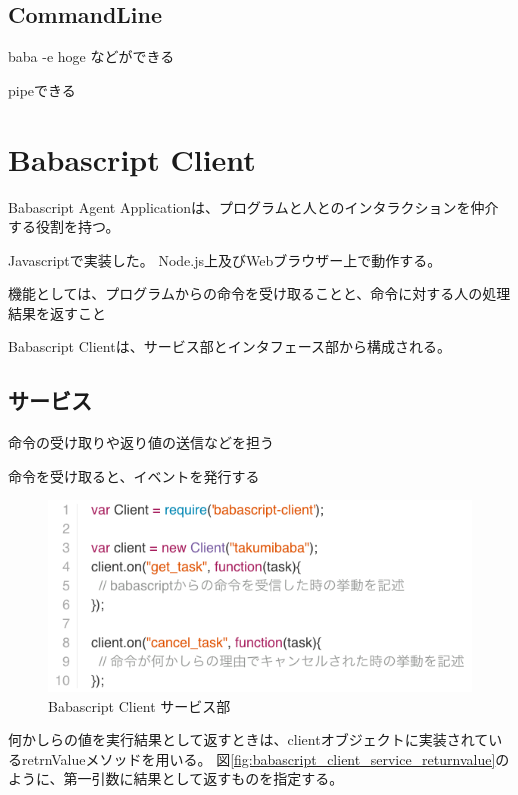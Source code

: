 \subsection{CommandLine}\label{commandline}

baba -e hoge などができる

pipeできる

\section{Babascript Client}\label{babascript-client}

Babascript Agent
Applicationは、プログラムと人とのインタラクションを仲介する役割を持つ。

Javascriptで実装した。 Node.js上及びWebブラウザー上で動作する。

機能としては、プログラムからの命令を受け取ることと、命令に対する人の処理結果を返すこと

Babascript Clientは、サービス部とインタフェース部から構成される。

\subsection{サービス}\label{ux30b5ux30fcux30d3ux30b9}

命令の受け取りや返り値の送信などを担う

命令を受け取ると、イベントを発行する

\begin{figure}[htbp]
  \begin{center}
  \includegraphics[width=.8\linewidth,bb=0 0 560 253]{images/babascript_client_service.js.png}
  \end{center}
  \caption{Babascript Client サービス部}
  \label{fig:babascript_client_service}
\end{figure}

何かしらの値を実行結果として返すときは、clientオブジェクトに実装されているretrnValueメソッドを用いる。
図\ref{fig:babascript_client_service_returnvalue}のように、第一引数に結果として返すものを指定する。

